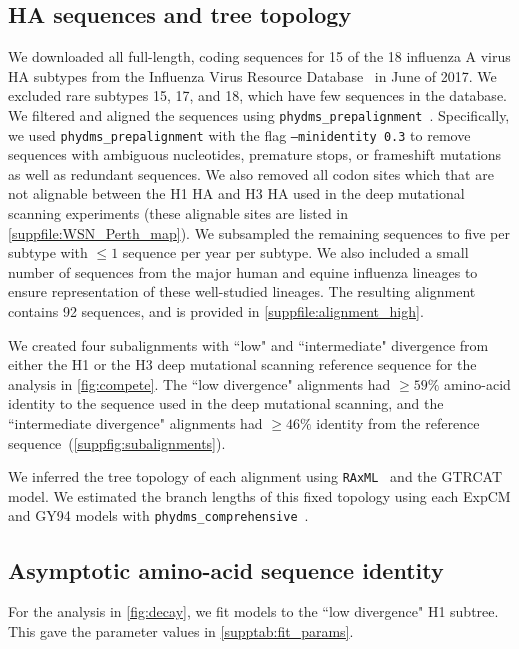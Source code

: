 \documentclass[11pt]{article}
\begin{document}
\subsection*{HA sequences and tree topology}

We downloaded all full-length, coding sequences for 15 of the 18 influenza A virus HA subtypes from the Influenza Virus Resource Database~\citep{bao2008influenza} in June of 2017. 
We excluded rare subtypes 15, 17, and 18, which have few sequences in the database.  
We filtered and aligned the sequences using \texttt{phydms\_prepalignment}~\citep{hilton2017phydms}. 
Specifically, we used \texttt{phydms\_prepalignment} with the flag \texttt{--minidentity 0.3} to remove sequences with ambiguous nucleotides, premature stops, or frameshift mutations as well as redundant sequences.  
We also removed all codon sites which that are not alignable between the H1 HA and H3 HA used in the deep mutational scanning experiments (these alignable sites are listed in  \ref{suppfile:WSN_Perth_map}). 
We subsampled the remaining sequences to five per subtype with $\le 1$ sequence per year per subtype. 
We also included a small number of sequences from the major human and equine influenza lineages to ensure representation of these well-studied lineages. 
The resulting alignment contains 92 sequences, and is provided in \ref{suppfile:alignment_high}. 

We created four subalignments with ``low" and ``intermediate" divergence from either the H1 or the H3 deep mutational scanning reference sequence for the analysis in \ref{fig:compete}. 
The ``low divergence" alignments had $\ge 59\%$ amino-acid identity to the sequence used in the deep mutational scanning, and the ``intermediate divergence" alignments had $\ge 46\%$ identity from the reference sequence~(\ref{suppfig:subalignments}).

We inferred the tree topology of each alignment using \texttt{RAxML}~\citep{stamatakis2006raxml} and the GTRCAT model. 
We estimated the branch lengths of this fixed topology using each ExpCM and GY94 models with \texttt{phydms\_comprehensive}~\citep{hilton2017phydms}. 

\subsection*{Asymptotic amino-acid sequence identity}
For the analysis in \ref{fig:decay}, we fit models to the ``low divergence" H1 subtree.
This gave the parameter values in \ref{supptab:fit_params}. 
\end{document}
